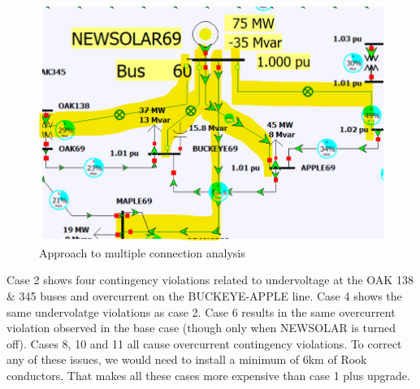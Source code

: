 \documentclass[conference]{IEEEtran}
\begin{document}
\begin{figure}[h]
	\centering
	\includegraphics[width=1\linewidth]{figures/multi}
	\caption{Approach to multiple connection analysis}
	\label{fig:multi}
\end{figure}

Case 2 shows four contingency violations related to undervoltage at the OAK 138 \& 345 buses and overcurrent on the BUCKEYE-APPLE line. Case 4 shows the same undervolatge violations as case 2. Case 6 results in the same overcurrent violation observed in the base case (though only when NEWSOLAR is turned off). Cases 8, 10 and 11 all cause overcurrent contingency violations. To correct any of these issues, we would need to install a minimum of 6km of Rook conductors. That makes all these cases more expensive than case 1 plus upgrade.
\end{document}
